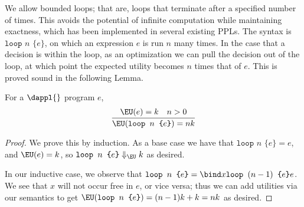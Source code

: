 We allow bounded loops; that are, loops that terminate after a specified number of times.
This avoids the potential of infinite computation while maintaining exactness, 
which has been implemented in several existing PPLs. 
The syntax is $\texttt{loop } n \texttt{ \{} e \texttt{\}}$, on which an expression $e$
is run $n$ many times.
In the case that a decision is within the loop, as an optimization we can pull the decision out of the loop, at which point the expected utility becomes $n$ times that of $e$. This is proved sound in the following Lemma.

\begin{lemma}
  For a $\dappl{}$ program $e$,
  \begin{equation}
  \infer
  {\EU(\texttt{loop } n \texttt{ \{} e \texttt{\}}) = nk}
  {\EU(e) = k & n >0}
\end{equation}
\end{lemma}

\begin{proof}
We prove this by induction.
As a base case we have that 
$\texttt{loop } n \texttt{ \{} e \texttt{\}} = e$,
and $\EU(e) =k $, so $\texttt{loop } n \texttt{ \{} e \texttt{\}} \Downarrow_{\EU} k$ 
as desired. 

In our inductive case, we observe that
$\texttt{loop } n \texttt{ \{} e \texttt{\}} = 
\bind x {\texttt{loop } (n-1) \texttt{ \{} e \texttt{\}}} e$. We see that $x$ will not occur free in $e$, 
or vice versa; thus we can add utilities via our semantics to get $\EU(\texttt{loop } n \texttt{ \{} e \texttt{\}}) = (n-1)k +k = nk$ as desired.  
\end{proof}